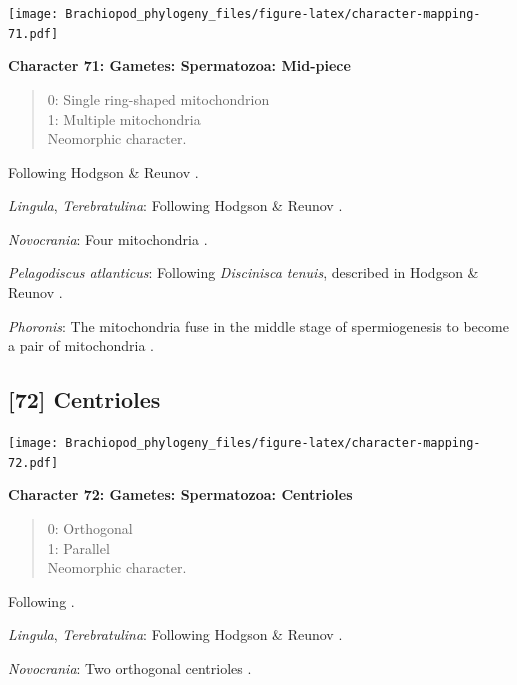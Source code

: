 \documentclass[openany]{book}
\theoremstyle{definition}
\theoremstyle{definition}
\theoremstyle{definition}
\theoremstyle{remark}
\begin{document}
\texttt{[image: Brachiopod\_phylogeny\_files/figure-latex/character-mapping-71.pdf]}

\textbf{Character 71: Gametes: Spermatozoa: Mid-piece}

\begin{quote}
0: Single ring-shaped mitochondrion\\
1: Multiple mitochondria\\
Neomorphic character.
\end{quote}

Following Hodgson \& Reunov \citeyearpar{Hodgson1994Ultrastructureof}.

\hypertarget{Lingula-coding-71}{}
\emph{Lingula}, \emph{Terebratulina}: Following Hodgson \& Reunov
\citeyearpar{Hodgson1994Ultrastructureof}.

\hypertarget{Novocrania-coding-71}{}
\emph{Novocrania}: Four mitochondria \citep{Afzelius1978Finestructure}.

\hypertarget{Pelagodiscus_atlanticus-coding-71}{}
\emph{Pelagodiscus atlanticus}: Following \emph{Discinisca}
\emph{tenuis}, described in Hodgson \& Reunov
\citeyearpar{Hodgson1994Ultrastructureof}.

\hypertarget{Phoronis-coding-71}{}
\emph{Phoronis}: The mitochondria fuse in the middle stage of
spermiogenesis to become a pair of mitochondria
\citep{Reunov2004Ultrastructuralstudy}.

\subsection*{{[}72{]} Centrioles}\label{centrioles}

\texttt{[image: Brachiopod\_phylogeny\_files/figure-latex/character-mapping-72.pdf]}

\textbf{Character 72: Gametes: Spermatozoa: Centrioles}

\begin{quote}
0: Orthogonal\\
1: Parallel\\
Neomorphic character.
\end{quote}

Following \citet{Hodgson1994Ultrastructureof}.

\hypertarget{Lingula-coding-72}{}
\emph{Lingula}, \emph{Terebratulina}: Following Hodgson \& Reunov
\citeyearpar{Hodgson1994Ultrastructureof}.

\hypertarget{Novocrania-coding-72}{}
\emph{Novocrania}: Two orthogonal centrioles
\citep{Afzelius1978Finestructure}.
\end{document}
